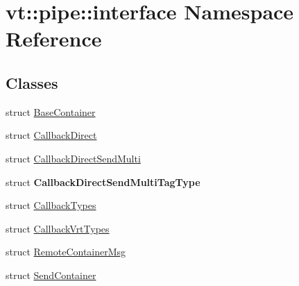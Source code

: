 \hypertarget{namespacevt_1_1pipe_1_1interface}{}\section{vt\+:\+:pipe\+:\+:interface Namespace Reference}
\label{namespacevt_1_1pipe_1_1interface}
\subsection*{Classes}
\begin{DoxyCompactItemize}
\item 
struct \hyperlink{structvt_1_1pipe_1_1interface_1_1_base_container}{Base\+Container}
\item 
struct \hyperlink{structvt_1_1pipe_1_1interface_1_1_callback_direct}{Callback\+Direct}
\item 
struct \hyperlink{structvt_1_1pipe_1_1interface_1_1_callback_direct_send_multi}{Callback\+Direct\+Send\+Multi}
\item 
struct {\bfseries Callback\+Direct\+Send\+Multi\+Tag\+Type}
\item 
struct \hyperlink{structvt_1_1pipe_1_1interface_1_1_callback_types}{Callback\+Types}
\item 
struct \hyperlink{structvt_1_1pipe_1_1interface_1_1_callback_vrt_types}{Callback\+Vrt\+Types}
\item 
struct \hyperlink{structvt_1_1pipe_1_1interface_1_1_remote_container_msg}{Remote\+Container\+Msg}
\item 
struct \hyperlink{structvt_1_1pipe_1_1interface_1_1_send_container}{Send\+Container}
\end{DoxyCompactItemize}
